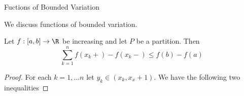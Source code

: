 \begin{chapter}{Fuctions of Bounded Variation}

We discuss functions of bounded variation. 

\begin{thm}
    Let $f:[a, b] \to \R$ be increasing and let $P$ be a partition.  Then 
    \[ \sum_{k = 1}^n f(x_k+)-f(x_k-) \leq f(b) - f(a) \]
\end{thm}

\begin{proof}
    For each $k = 1, \dots n$ let $y_k \in (x_k, x_x+1)$. We have the following two inequalities 

\end{proof}


\end{chapter}
